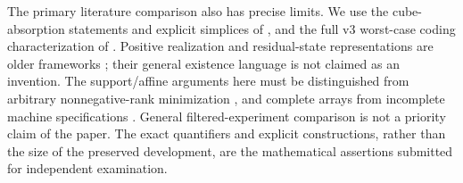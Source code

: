 The primary literature comparison also has precise limits. We use the
cube-absorption statements and explicit simplices of \cite{NU}, and
the full v3 worst-case coding characterization of \cite{Kondo2026}.
Positive realization and residual-state representations are older
frameworks \cite{Heller,Vidyasagar,ELDD02,DenisEsposito}; their general
existence language is not claimed as an invention. The support/affine
arguments here must be distinguished from arbitrary nonnegative-rank
minimization \cite{GG}, and complete arrays from incomplete machine
specifications \cite{Reusch}. General filtered-experiment comparison
\cite{Norberg} is not a priority claim of the paper. The exact
quantifiers and explicit constructions, rather than the size of the
preserved development, are the mathematical assertions submitted for
independent examination.
